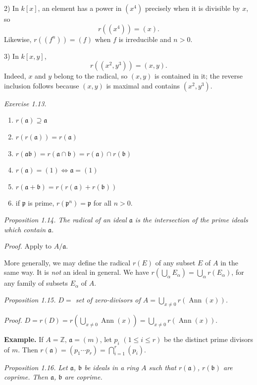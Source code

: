 2) In $k[x]$, an element has a power in $(x^4)$ precisely when it is divisible
by $x$, so
\[
r((x^4))=(x).
\]
Likewise, $r((f^n))=(f)$ when $f$ is irreducible and $n>0$.

3) In $k[x,y]$,
\[
r((x^2,y^3))=(x,y).
\]
Indeed, $x$ and $y$ belong to the radical, so $(x,y)$ is contained in it; the
reverse inclusion follows because $(x,y)$ is maximal and contains
$(x^2,y^3)$.
\textline

\noindent\textit{Exercise 1.13.}
\begin{enumerate}
\renewcommand{\labelenumi}{\roman{enumi})}
\item $r(\mathfrak a)\supseteq\mathfrak a$
\item $r(r(\mathfrak a))=r(\mathfrak a)$
\item $r(\mathfrak a\mathfrak b)=r(\mathfrak a\cap\mathfrak b)=r(\mathfrak a)\cap r(\mathfrak b)$
\item $r(\mathfrak a)=(1)\Longleftrightarrow\mathfrak a=(1)$
\item $r(\mathfrak a+\mathfrak b)=r(r(\mathfrak a)+r(\mathfrak b))$
\item if $\mathfrak p$ is prime, $r(\mathfrak p^n)=\mathfrak p$ for all $n>0$.
\end{enumerate}

\noindent\textit{Proposition 1.14. The radical of an ideal $\mathfrak a$ is the intersection of the prime ideals which contain $\mathfrak a$.}

\noindent\textit{Proof.} Apply  to $A/\mathfrak a$. \proofbox

More generally, we may define the radical $r(E)$ of any subset $E$ of $A$ in the same way. It is \textit{not} an ideal in general. We have $r(\bigcup_\alpha E_\alpha)=\bigcup_\alpha r(E_\alpha)$, for any family of subsets $E_\alpha$ of $A$.

\noindent\textit{Proposition 1.15. $D={}$ set of zero-divisors of $A=\bigcup_{x\neq0}r(\operatorname{Ann}(x))$.}

\noindent\textit{Proof.} $D=r(D)=r(\bigcup_{x\neq0}\operatorname{Ann}(x))=\bigcup_{x\neq0}r(\operatorname{Ann}(x))$. \proofbox

\noindent\textbf{Example.} If $A=\mathbb Z$, $\mathfrak a=(m)$, let $p_i$ $(1\leq i\leq r)$ be the distinct prime divisors of $m$. Then $r(\mathfrak a)=(p_1\cdots p_r)=\bigcap_{i=1}^r(p_i)$.

\noindent\textit{Proposition 1.16. Let $\mathfrak a$, $\mathfrak b$ be ideals in a ring $A$ such that $r(\mathfrak a)$, $r(\mathfrak b)$ are coprime. Then $\mathfrak a$, $\mathfrak b$ are coprime.}

